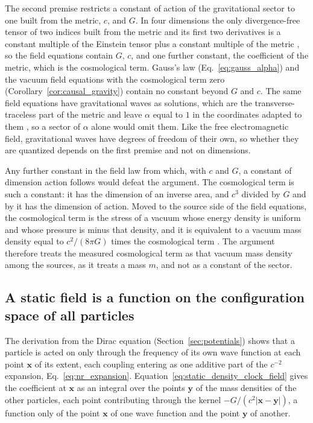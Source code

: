\documentclass[aps,prd,onecolumn,tightenlines,nofootinbib,notitlepage,11pt,floatfix]{revtex4-2}
\theoremstyle{indentedtheorem}
\begin{document}
The second premise restricts a constant of action of the gravitational sector to one built from the metric, $c$, and $G$. In four dimensions the only divergence-free tensor of two indices built from the metric and its first two derivatives is a constant multiple of the Einstein tensor plus a constant multiple of the metric \citep{Lovelock1972Four}, so the field equations contain $G$, $c$, and one further constant, the coefficient of the metric, which is the cosmological term. Gauss's law (Eq.~\eqref{eq:gauss_alpha}) and the vacuum field equations with the cosmological term zero (Corollary~\ref{cor:causal_gravity}) contain no constant beyond $G$ and $c$. The same field equations have gravitational waves as solutions, which are the transverse-traceless part of the metric and leave $\alpha$ equal to $1$ in the coordinates adapted to them \citep{Flanagan2005Basics}, so a sector of $\alpha$ alone would omit them. Like the free electromagnetic field, gravitational waves have degrees of freedom of their own, so whether they are quantized depends on the first premise and not on dimensions.

Any further constant in the field law from which, with $c$ and $G$, a constant of dimension action follows would defeat the argument. The cosmological term is such a constant: it has the dimension of an inverse area, and $c^3$ divided by $G$ and by it has the dimension of action. Moved to the source side of the field equations, the cosmological term is the stress of a vacuum whose energy density is uniform and whose pressure is minus that density, and it is equivalent to a vacuum mass density equal to $c^2/(8\pi G)$ times the cosmological term \citep{Carroll2001Cosmological}. The argument therefore treats the measured cosmological term as that vacuum mass density among the sources, as it treats a mass $m$, and not as a constant of the sector.

\subsection{A static field is a function on the configuration space of all particles}
\label{sec:fields_gravity}

The derivation from the Dirac equation (Section~\ref{sec:potentials}) shows that a particle is acted on only through the frequency of its own wave function at each point $\mathbf{x}$ of its extent, each coupling entering as one additive part of the $c^{-2}$ expansion, Eq.~\eqref{eq:nr_expansion}. Equation~\eqref{eq:static_density_clock_field} gives the coefficient at $\mathbf{x}$ as an integral over the points $\mathbf{y}$ of the mass densities of the other particles, each point contributing through the kernel $-G/(c^2|\mathbf{x}-\mathbf{y}|)$, a function only of the point $\mathbf{x}$ of one wave function and the point $\mathbf{y}$ of another.
\end{document}
